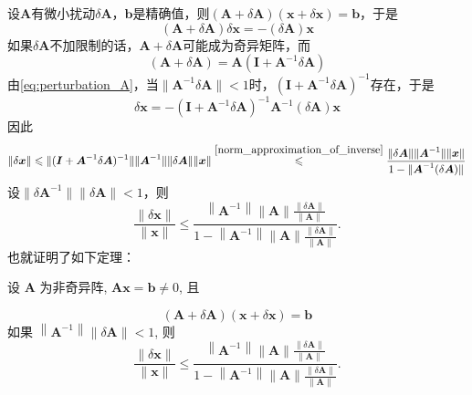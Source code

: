 设$\boldsymbol{A}$有微小扰动$\delta \boldsymbol{A}$，$\boldsymbol{b}$是精确值，则$(\boldsymbol{A}+\delta \boldsymbol{A})(\boldsymbol{x}+\delta \boldsymbol{x})=\boldsymbol{b}$，于是
\begin{equation}\label{eq:perturbation_A}
    (\boldsymbol{A}+\delta \boldsymbol{A})\delta \boldsymbol{x}=-(\delta \boldsymbol{A})\boldsymbol{x}
\end{equation}
如果$\delta \boldsymbol{A}$不加限制的话，$\boldsymbol{A}+\delta \boldsymbol{A}$可能成为奇异矩阵，而
\[
    (\boldsymbol{A}+\delta \boldsymbol{A})=\boldsymbol{A}(\boldsymbol{I}+\boldsymbol{A}^{-1}\delta \boldsymbol{A})
\]
由\ref{eq:perturbation_A}，当$\lVert\boldsymbol{A}^{-1}\delta \boldsymbol{A}\rVert<1$时，$(\boldsymbol{I}+\boldsymbol{A}^{-1}\delta \boldsymbol{A})^{-1}$存在，于是
\[
    \delta \boldsymbol{x} = -(\boldsymbol{I}+\boldsymbol{A}^{-1}\delta \boldsymbol{A})^{-1}\boldsymbol{A}^{-1}(\delta \boldsymbol{A}) \boldsymbol{x}
\]
因此
\[
    \lVert\delta \boldsymbol{x}\rVert\leqslant \lVert (\boldsymbol{I}+\boldsymbol{A}^{-1}\delta \boldsymbol{A})^{-1}\rVert\lVert \boldsymbol{A}^{-1}\rVert\lVert\delta \boldsymbol{A}\rVert\lVert \boldsymbol{x}\rVert\overset{\ref{norm_approximation_of_inverse}}{\leqslant} \frac{\lVert\delta \boldsymbol{A}\rVert\lVert \boldsymbol{A}^{-1}\rVert\lVert \boldsymbol{x}\rVert}{1-\lVert \boldsymbol{A}^{-1}(\delta \boldsymbol{A})\rVert}
\]
设$\lVert\delta \boldsymbol{A}^{-1}\rVert \lVert \delta \boldsymbol{A}\rVert<1$，则
\[
    \frac{\|\delta \boldsymbol{x}\|}{\|\boldsymbol{x}\|} \leqslant \frac{\left\|\boldsymbol{A}^{-1}\right\|\|\boldsymbol{A}\| \frac{\|\delta \boldsymbol{A}\|}{\|\boldsymbol{A}\|}}{1-\left\|\boldsymbol{A}^{-1}\right\|\|\boldsymbol{A}\| \frac{\|\delta \boldsymbol{A}\|}{\|\boldsymbol{A}\|}} .
\]
也就证明了如下定理：
\begin{theorem}
    设 $\boldsymbol{A}$ 为非奇异阵, $\boldsymbol{A x}=\boldsymbol{b} \neq 0$, 且

    $$
        (\boldsymbol{A}+\delta \boldsymbol{A})(\boldsymbol{x}+\delta \boldsymbol{x})=\boldsymbol{b}
    $$
    如果 $\left\|\boldsymbol{A}^{-1}\right\|\|\delta \boldsymbol{A}\|<1$, 则
    $$
        \frac{\|\delta \boldsymbol{x}\|}{\|\boldsymbol{x}\|} \leqslant \frac{\left\|\boldsymbol{A}^{-1}\right\|\|\boldsymbol{A}\| \frac{\|\delta \boldsymbol{A}\|}{\|\boldsymbol{A}\|}}{1-\left\|\boldsymbol{A}^{-1}\right\|\|\boldsymbol{A}\| \frac{\|\delta \boldsymbol{A}\|}{\|\boldsymbol{A}\|}} .
    $$
\end{theorem}
















